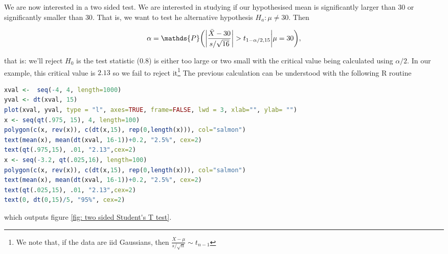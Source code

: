\documentclass{homework}
\begin{document}
We are now interested in a two sided test. We are interested in studying if our hypothesised mean is significantly larger than $30$ or significantly smaller than $30$. That is, we want to test he alternative hypothesis $H_a: \mu \neq 30$. Then

$$
\alpha = \mathds{P}\bigg(\bigg|\frac{\Bar{X}-30}{s/\sqrt{16}}\bigg| > t_{1-\alpha/2, 15}\bigg| \mu = 30\bigg),
$$

that is: we'll reject $H_0$ is the test statistic (0.8) is either too large or two small with the critical value being calculated using $\alpha/2$. In our example, this critical value is $2.13$ so we fail to reject it\footnote{We note that, if the data are iid Gaussians, then $\frac{X-\mu}{s/\sqrt{n}} \sim t_{n-1}$} The previous calculation can be understood with the following R routine 

\begin{lstlisting}[language=R]
xval <-  seq(-4, 4, length=1000)
yval <- dt(xval, 15)
plot(xval, yval, type = "l", axes=TRUE, frame=FALSE, lwd = 3, xlab="", ylab= "")
x <- seq(qt(.975, 15), 4, length=100)
polygon(c(x, rev(x)), c(dt(x,15), rep(0,length(x))), col="salmon")
text(mean(x), mean(dt(xval, 16-1))+0.2, "2.5%", cex=2)
text(qt(.975,15), .01, "2.13",cex=2)
x <- seq(-3.2, qt(.025,16), length=100)
polygon(c(x, rev(x)), c(dt(x,15), rep(0,length(x))), col="salmon")
text(mean(x), mean(dt(xval, 16-1))+0.2, "2.5%", cex=2)
text(qt(.025,15), .01, "2.13",cex=2)
text(0, dt(0,15)/5, "95%", cex=2)
\end{lstlisting}

which outputs figure \ref{fig: two sided Student's T test}. \\
\end{document}
